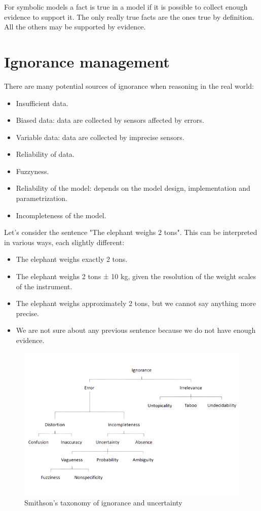 \documentclass[12pt, a4paper]{report}
\begin{document}
    For symbolic models a fact is true in a model if it is possible to collect enough evidence to support it. The only really true facts 
    are the ones true by definition. All the others may be supported by evidence. 
    
    \section{Ignorance management}
    There are many potential sources of ignorance when reasoning in the real world:
    \begin{itemize}
        \item Insufficient data.
        \item Biased data: data are collected by sensors affected by errors. 
        \item Variable data: data are collected by imprecise sensors.
        \item Reliability of data. 
        \item Fuzzyness. 
        \item Reliability of the model: depends on the model design, implementation and parametrization. 
        \item Incompleteness of the model. 
    \end{itemize}
    \begin{example}
        Let's consider the sentence "The elephant weighs 2 tons". This can be interpreted in various ways, each slightly different:
        \begin{itemize}
            \item The elephant weighs exactly 2 tons.
            \item The elephant weighs 2 tons ± 10 kg, given the resolution of the weight scales of the instrument.
            \item The elephant weighs approximately 2 tons, but we cannot say anything more precise.
            \item We are not sure about any previous sentence because we do not have enough evidence.
        \end{itemize}
    \end{example}
    \begin{figure}[H]
        \centering
        \includegraphics[width=1\linewidth]{images/smithson.png}
        \caption{Smithson's taxonomy of ignorance and uncertainty}
    \end{figure}
\end{document}
